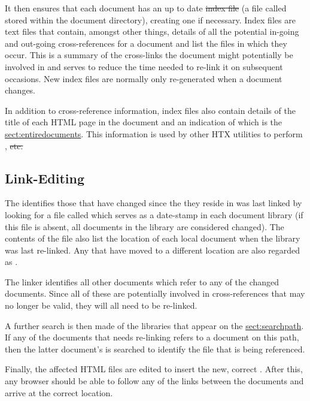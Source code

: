 It then ensures that each document has an up to date \st{index file}
(a file called  stored within the document directory),
creating one if necessary. Index files are text files that contain,
amongst other things, details of all the potential in-going and
out-going cross-references for a document and list the 
files in which they occur.  This is a summary of the cross-links the
document might potentially be involved in and serves to reduce the
time needed to re-link it on subsequent occasions. New index files are
normally only re-generated when a document changes.

In addition to cross-reference information, index files also contain
details of the title of each HTML page in the document and an
indication of which is the \hyperref{\qt{top} page}{\qt{top} page (see
\S}{)}{sect:entiredocuments}. This information is used by other HTX
utilities to perform , \st{etc.}

\subsection{\label{sect:linkediting}Link-Editing}

The  identifies those  that have
changed since the  they reside in was last linked by
looking for a file called  which serves as a date-stamp in
each document library (if this file is absent, all documents in the
library are considered changed). The contents of the  file
also list the location of each local document when the library was
last re-linked. Any that have moved to a different location are also
regarded as .

The linker identifies all other documents which refer to any of the
changed documents. Since all of these are potentially involved in
cross-references that may no longer be valid, they will all need to be
re-linked.

A further search is then made of the libraries that appear on the
\hyperref{\hi{HTX\_PATH} search path}{\hi{HTX\_PATH} search path (see
\S}{)}{sect:searchpath}. If any of the documents that needs re-linking
refers to a document on this path, then the latter document's
 is searched to identify the  file
that is being referenced.

Finally, the affected HTML files are edited to insert the new, correct
. After this, any  browser should be able to
follow any of the links between the documents and arrive at the
correct location.

